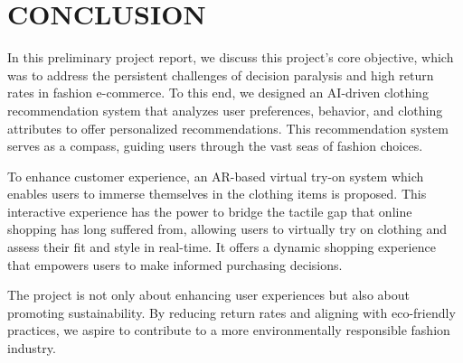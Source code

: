 \chapter{CONCLUSION}

In this preliminary project report, we discuss this project's core objective, which was to address the persistent challenges of decision paralysis and high return rates in fashion e-commerce. To this end, we designed an AI-driven clothing recommendation system that analyzes user preferences, behavior, and clothing attributes to offer personalized recommendations. This recommendation system serves as a compass, guiding users through the vast seas of fashion choices.

To enhance customer experience, an AR-based virtual try-on system which enables users to immerse themselves in the clothing items is proposed. This interactive experience has the power to bridge the tactile gap that online shopping has long suffered from, allowing users to virtually try on clothing and assess their fit and style in real-time. It offers a dynamic shopping experience that empowers users to make informed purchasing decisions.

The project is not only about enhancing user experiences but also about promoting sustainability. By reducing return rates and aligning with eco-friendly practices, we aspire to contribute to a more environmentally responsible fashion industry.